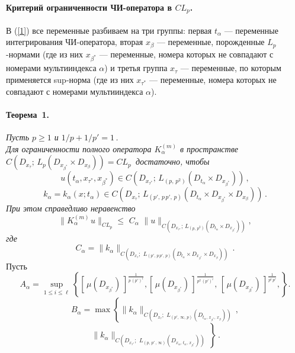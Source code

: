 \paragraph{Критерий ограниченности ЧИ-оператора в $CL_p$.}
В (\ref{1}) все переменные разбиваем на три группы: первая $t_\alpha$ --- переменные интегрирования ЧИ-оператора, вторая  $x_\beta$ --- переменные, порожденные $L_p$-нормами (где из них $x_{\beta^*}$ --- переменные, номера которых не совпадают с номерами мультииндекса $\alpha$) и третья группа $x_{\tau}$ --- переменные, по которым применяется sup-норма (где из них $x_{\tau^*}$ --- переменные, номера которых не совпадают с номерами мультииндекса $\alpha$).

\paragraph{Теорема~1.}
 {\it Пусть $p \geq1$ и $1/p+1/p'=1$\,. \\
 Для ограниченности полного оператора $K_\alpha^{(m)}$  в пространстве
$C(D_{x_\tau};\,L_{{p}}( D_{x_{\beta^*}} {\times}  D_{x_{\beta}}))=CL_{p}\,$
достаточно, чтобы
$$
u(t_\alpha,x_{\tau^*},x_{\beta^*})\in
C(D_{x_{\tau^{*}}};\,L_{(p,\, p^2)}(D_{t_\alpha}{\times} D_{x_{\beta^*}} ))\,,
$$
$$
k_\alpha=k_\alpha(x;t_\alpha)\in C(D_{x_\tau};\,L_{(p',\,p\, p',\,p)}(D_{t_\alpha}{\times} D_{x_{\beta^*}}{\times} D_{x_{\beta}} ))\,.
$$
При этом справедливо неравенство
$$
\|K_{\alpha}^{(m)\,} u\|_{CL_{p}}
{\leq}\,\, C_{\alpha} \,\,\|u\|_{C(D_{x_{\tau^*}};\,L_{(p,\,p^2)}(D_{t_\alpha}\times D_{x_{\beta^*}}))},
$$
где
$$
  C_{\alpha}= \|k_{\alpha}\|_{C(D_{x_\tau};\,\, L_{(p',\,p\, p',\, p)}(D_{t_\alpha}\times D_{x_{\beta^*}}\times D_{x_\beta}))}\,.
$$}
 Пусть
$$
A_\alpha=\sup\limits_{1\leq i\leq {\ell}}\left\{[\,\mu(D_{x_{\beta^*}})\,]^{\frac{1}{p \, (p')^\ell}}, [\,\mu(D_{x_{\beta^*}})\,]^{\frac{1}{p^2\,(p')^i}},\, [\,\mu(D_{x_{\beta^*}})\,]^{\frac{1}{p^i \, p'}},\right\}.
$$
$$
B_\alpha= \max \left\{\|k_\alpha\|_{C(D_{x_\tau};\,\, L_{(p',\, \infty,\, p)}(D_{t_\alpha,\, x_{\beta^*},\,x_{\beta}}))}\,,\right.
$$
$$
\,\left.\|k_\alpha\|_{ C(D_{x_{\tau^*}};\,\, L_{(p,\, p'\,,\, \infty)}(D_{x_\alpha,\, t_{\alpha},\,x_{\beta^*}}))}\, \right\}\,.
$$

